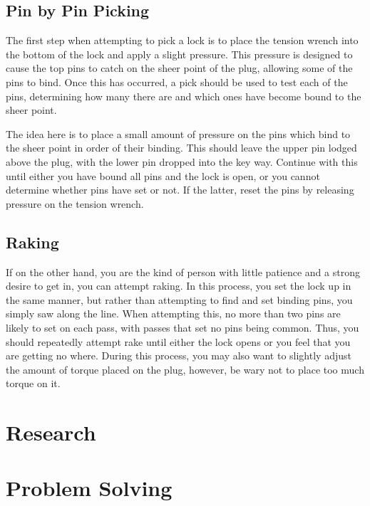 \documentclass[a4paper,11pt]{report}
\begin{document}
		\subsection{Pin by Pin Picking}
			The first step when attempting to pick a lock is to place the tension wrench into the bottom of the lock and apply a slight pressure. 
			This pressure is designed to cause the top pins to catch on the sheer point of the plug, allowing some of the pins to bind. 
			Once this has occurred, a pick should be used to test each of the pins, determining how many there are and which ones have become bound to the sheer point. 

			The idea here is to place a small amount of pressure on the pins which bind to the sheer point in order of their binding. 
			This should leave the upper pin lodged above the plug, with the lower pin dropped into the key way. 
			Continue with this until either you have bound all pins and the lock is open, or you cannot determine whether pins have set or not. 
			If the latter, reset the pins by releasing pressure on the tension wrench. 
		\subsection{Raking}
			If on the other hand, you are the kind of person with little patience and a strong desire to get in, you can attempt raking. 
			In this process, you set the lock up in the same manner, but rather than attempting to find and set binding pins, you simply saw along the line. 
			When attempting this, no more than two pins are likely to set on each pass, with passes that set no pins being common. 
			Thus, you should repeatedly attempt rake until either the lock opens or you feel that you are getting no where. 
			During this process, you may also want to slightly adjust the amount of torque placed on the plug, however, be wary not to place too much torque on it. 

	\section{Research}
	\section{Problem Solving}
\end{document}
